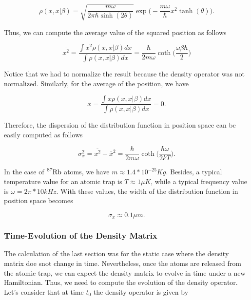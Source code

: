 \documentclass{article}
\begin{document}
\begin{equation}
    \rho(x,x|\beta) = \sqrt{\frac{m\omega}{2\pi\hbar\sinh(2\theta)}} \exp \bigg( -\frac{m\omega}{\hbar}x^{2} \tanh(\theta) \bigg).
\end{equation}

Thus, we can compute the average value of the squared position as follows

\begin{equation}
    \overline{x^{2}} = \frac{\int x^{2} \rho(x,x|\beta) dx}{\int \rho(x,x|\beta) dx} = \frac{\hbar}{2m\omega} \coth\bigg( \frac{\omega\beta\hbar}{2} \bigg)
\end{equation}

Notice that we had to normalize the result because the density operator was not normalized. Similarly, for the average of the position, we have

\begin{equation}
    \overline{x} = \frac{\int x \rho(x,x|\beta) dx}{\int \rho(x,x|\beta) dx} = 0.
\end{equation}

Therefore, the dispersion of the distribution function in position space can be easily computed as follows

\begin{equation}\label{dispersion_harmonic_oscillator}
    \sigma_{x}^{2} = \overline{x^{2}} - \overline{x}^{2} = \frac{\hbar}{2m\omega} \coth \bigg( \frac{\hbar\omega}{2kT} \bigg).
\end{equation}

In the case of $\ce{^{87}_{}Rb}$ atoms, we have $m\approx1.4*10^{-25} Kg$. Besides, a typical temperature value for an atomic trap is $T\approx 1 \mu K$, while a typical frequency value is $\omega = 2\pi *10 kHz$. With these values, the width of the distribution function in position space becomes

\begin{equation}
    \sigma_{x} \approx 0.1 \mu m.
\end{equation}

\subsubsection{Time-Evolution of the Density Matrix}
The calculation of the last section was for the static case where the density matrix doe snot change in time. Nevertheless, once the atoms are released from the atomic trap, we can expect the density matrix to evolve in time under a new Hamiltonian. Thus, we need to compute the evolution of the density operator. Let's consider that at time $t_{0}$ the density operator is given by
\end{document}
